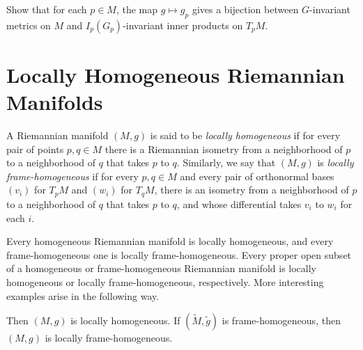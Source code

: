 \begin{corollary}
\label{cor:invariant-metric-compact-isotropy}
\end{corollary}

\begin{exercise}
\label{exer:invariant-metrics-bijection}
Show that for each $p \in M$, the map $g \mapsto g_p$ gives a bijection between $G$-invariant metrics on $M$ and $I_p(G_p)$-invariant inner products on $T_p M$.
\end{exercise}

\section{Locally Homogeneous Riemannian Manifolds}

A Riemannian manifold $(M, g)$ is said to be \emph{locally homogeneous} if for every pair
of points $p, q \in M$ there is a Riemannian isometry from a neighborhood of $p$ to a
neighborhood of $q$ that takes $p$ to $q$. Similarly, we say that $(M, g)$ is \emph{locally frame-homogeneous} if for every $p, q \in M$ and every pair of orthonormal bases $(v_i)$ for
$T_p M$ and $(w_i)$ for $T_q M$, there is an isometry from a neighborhood of $p$ to a neighborhood of $q$ that takes $p$ to $q$, and whose differential takes $v_i$ to $w_i$ for each $i$.

Every homogeneous Riemannian manifold is locally homogeneous, and every frame-homogeneous one is locally frame-homogeneous. Every proper open subset of a homogeneous or frame-homogeneous Riemannian manifold is locally homogeneous or locally frame-homogeneous, respectively. More interesting examples arise in the following way.

\begin{proposition}
\label{prop:covering-locally-homogeneous}
Then $(M, g)$ is locally homogeneous. If $(\tilde{M}, \tilde{g})$ is frame-homogeneous, then $(M, g)$ is locally frame-homogeneous.
\end{proposition}

